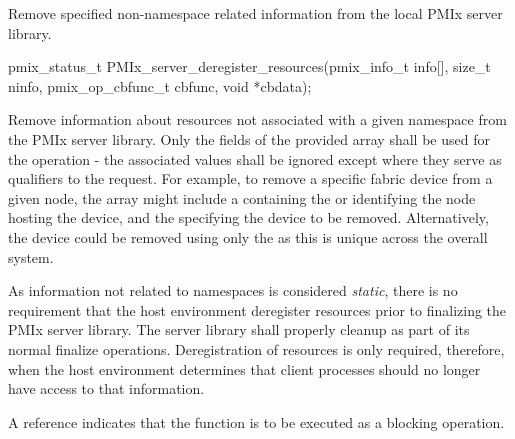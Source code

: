 \summary

Remove specified non-namespace related information from the local \ac{PMIx} server library.

\format

\cspecificstart
\begin{codepar}
pmix_status_t
PMIx_server_deregister_resources(pmix_info_t info[], size_t ninfo,
                                 pmix_op_cbfunc_t cbfunc,
                                 void *cbdata);
\end{codepar}
\cspecificend

\begin{arglist}
\end{arglist}

\descr

Remove information about resources not associated with a given namespace from the \ac{PMIx} server library. Only the  fields of the provided  array shall be used for the operation - the associated values shall be ignored except where they serve as qualifiers to the request. For example, to remove a specific fabric device from a given node, the  array might include a  containing the  or  identifying the node hosting the device, and the  specifying the device to be removed. Alternatively, the device could be removed using only the  as this is unique across the overall system.

\advicermstart
As information not related to namespaces is considered \emph{static}, there is no requirement that the host environment deregister resources prior to finalizing the \ac{PMIx} server library. The server library shall properly cleanup as part of its normal finalize operations. Deregistration of resources is only required, therefore, when the host environment determines that client processes should no longer have access to that information.

A   reference indicates that the function is to be executed as a blocking operation.
\advicermend


